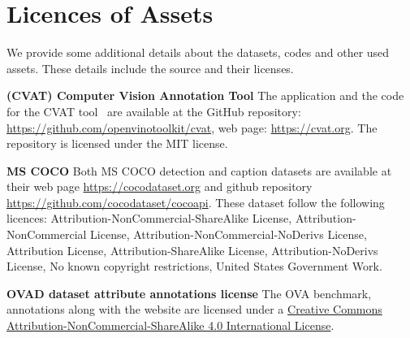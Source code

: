 \documentclass[10pt,twocolumn,letterpaper]{article}
\renewcommand\paragraph[1]{\vspace{0.12cm}\noindent\textbf{#1}}
\begin{document}
\section{Licences of Assets}
We provide some additional details about the datasets, codes and other used assets. These details include the source and their licenses.

\paragraph{(CVAT) Computer Vision Annotation Tool}
The application and the code for the CVAT tool~\cite{cvat} are available at the GitHub repository: \url{https://github.com/openvinotoolkit/cvat}, web page: \url{https://cvat.org}. The repository is licensed under the MIT license.


\paragraph{MS COCO}
Both MS COCO detection and caption datasets \cite{coco, cocoCaptions} are available at their web page \url{https://cocodataset.org} and github repository \url{https://github.com/cocodataset/cocoapi}. These dataset follow the following licences: Attribution-NonCommercial-ShareAlike License, Attribution-NonCommercial License, Attribution-NonCommercial-NoDerivs License, Attribution License, Attribution-ShareAlike License, Attribution-NoDerivs License, No known copyright restrictions, United States Government Work.









\paragraph{OVAD dataset attribute annotations license}
The OVA benchmark, annotations along with the website are licensed under a \href{https://creativecommons.org/licenses/by-nc-sa/4.0/}{Creative Commons Attribution-NonCommercial-ShareAlike 4.0 International License}.
\end{document}
